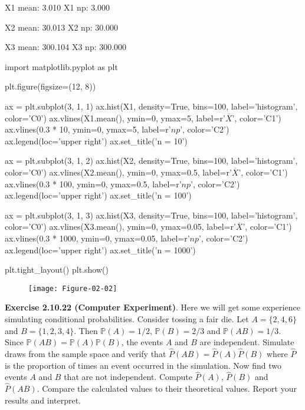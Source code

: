 \begin{console}
X1 mean: 3.010
X1 np:   3.000

X2 mean: 30.013
X2 np:   30.000

X3 mean: 300.104
X3 np:   300.000
\end{console}

\begin{python}
import matplotlib.pyplot as plt

plt.figure(figsize=(12, 8))

ax = plt.subplot(3, 1, 1)
ax.hist(X1, density=True, bins=100, label='histogram', color='C0')
ax.vlines(X1.mean(), ymin=0, ymax=5, label=r'$\overline{X}$', color='C1')
ax.vlines(0.3 * 10, ymin=0, ymax=5, label=r'$np$', color='C2')
ax.legend(loc='upper right')
ax.set_title('n = 10')

ax = plt.subplot(3, 1, 2)
ax.hist(X2, density=True, bins=100, label='histogram', color='C0')
ax.vlines(X2.mean(), ymin=0, ymax=0.5, label=r'$\overline{X}$', color='C1')
ax.vlines(0.3 * 100, ymin=0, ymax=0.5, label=r'$np$', color='C2')
ax.legend(loc='upper right')
ax.set_title('n = 100')

ax = plt.subplot(3, 1, 3)
ax.hist(X3, density=True, bins=100, label='histogram', color='C0')
ax.vlines(X3.mean(), ymin=0, ymax=0.05, label=r'$\overline{X}$', color='C1')
ax.vlines(0.3 * 1000, ymin=0, ymax=0.05, label=r'$np$', color='C2')
ax.legend(loc='upper right')
ax.set_title('n = 1000')

plt.tight_layout()
plt.show()
\end{python}

\begin{figure}[H]
\centering
\texttt{[image: Figure-02-02]}
\end{figure}

\textbf{Exercise 2.10.22 (Computer Experiment)}. Here we will get some experience simulating conditional probabilities. Consider tossing a fair die. Let \(A = \{2, 4, 6\}\) and \(B = \{1, 2, 3, 4\}\). Then \(\mathbb{P}(A) = 1/2\), \(\mathbb{P}(B) = 2/3\) and \(\mathbb{P}(AB) = 1/3\). Since \(\mathbb{P}(AB) = \mathbb{P}(A) \mathbb{P}(B)\), the events \(A\) and \(B\) are independent. Simulate draws from the sample space and verify that \(\hat{P}(AB) = \hat{P}(A) \hat{P}(B)\) where \(\hat{P}\) is the proportion of times an event occurred in the simulation. Now find two events \(A\) and \(B\) that are not independent. Compute \(\hat{P}(A)\), \(\hat{P}(B)\) and \(\hat{P}(AB)\). Compare the calculated values to their theoretical values. Report your results and interpret.

